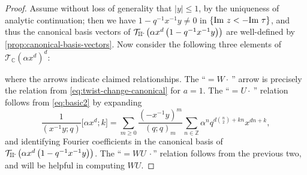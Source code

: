 \documentclass[reqno,11pt]{amsart}
\theoremstyle{definition}
\theoremstyle{remark}
\numberwithin{equation}{section}
\newcommand{\Z}{\mathbb{Z}}
\newcommand{\C}{\mathbb{C}}
\newcommand{\Hminus}{{\mathbb{H}^{\textnormal{-}\hspace{-0.03cm}}}}
\newcommand{\mT}{\mathcal{T}}
\renewcommand{\Im}{\textnormal{Im}\ }
\newcommand{\vect}[2]{\big[{#1};{#2}\big]}
\begin{document}
\begin{proof}
Assume without loss of generality that $|y| \le 1$, by the uniqueness of analytic continuation; then we have $1 - q^{-1} x^{-1} y \neq 0$ in $\{\Im z < -\Im \tau\}$, and thus the canonical basis vectors of $\mT_\Hminus \left(\alpha x^d \left(1 - q^{-1} x^{-1} y\right) \right)$ are well-defined by \cref{prop:canonical-basis-vectors}. Now consider the following three elements of $\mT_\C\left(\alpha x^d\right)^d$:
\begin{center}
\small
{}
\end{center}
where the arrows indicate claimed relationships. The ``$= W \cdot\ $'' arrow is precisely the relation from \cref{eq:twist-change-canonical} for $a = 1$. The ``$= U \cdot\ $'' relation follows from \cref{eq:basic2} by expanding
\[
    \frac{1}{\left(x^{-1}y; q\right)} \vect{\alpha x^d}{k} 
    =
    \sum_{m \ge 0} \frac{\left(-x^{-1}y\right)^m}{(q; q)_m} \sum_{n \in \Z} \alpha^n q^{d\binom{n}{2}+kn} x^{dn+k},
\]
and identifying Fourier coefficients in the canonical basis of $\mT_\Hminus \left(\alpha x^d \left(1 - q^{-1} x^{-1} y\right) \right)$. The ``$= WU\ \cdot$'' relation follows from the previous two, and will be helpful in computing $WU$.


\end{proof}
\end{document}
